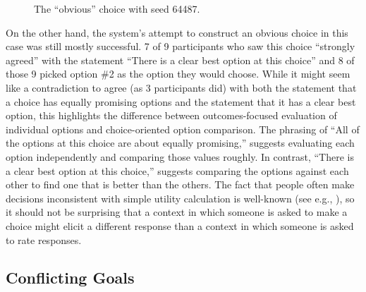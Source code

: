 \begin{figure}[h]
  \caption{The ``obvious'' choice with seed 64487.}
  \label{fig:ch64487}
\end{figure}


On the other hand, the system's attempt to construct an obvious choice in this case was still mostly successful.
%
7 of 9 participants who saw this choice ``strongly agreed'' with the statement ``There is a clear best option at this choice'' and 8 of those 9 picked option \#2 as the option they would choose.
%
While it might seem like a contradiction to agree (as 3 participants did) with both the statement that a choice has equally promising options and the statement that it has a clear best option, this highlights the difference between outcomes-focused evaluation of individual options and choice-oriented option comparison.
%
The phrasing of ``All of the options at this choice are about equally promising,'' suggests evaluating each option independently and comparing those values roughly.
%
In contrast, ``There is a clear best option at this choice,'' suggests comparing the options against each other to find one that is better than the others.
%
The fact that people often make decisions inconsistent with simple utility calculation is well-known (see e.g., \citep{Tversky1993}), so it should not be surprising that a context in which someone is asked to make a choice might elicit a different response than a context in which someone is asked to rate responses.


\subsection{Conflicting Goals}


